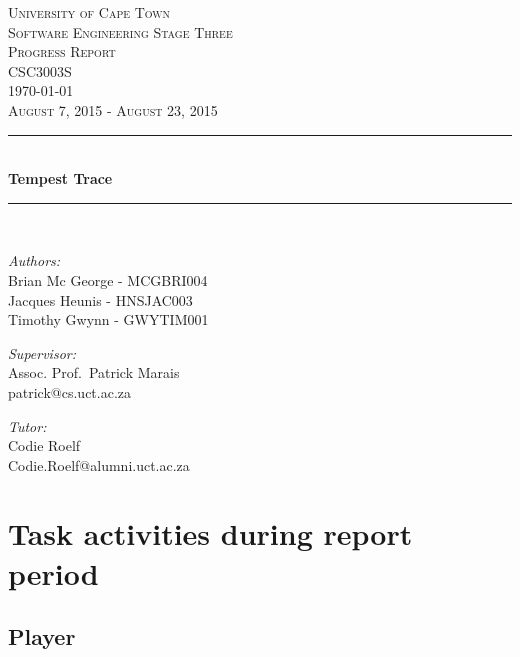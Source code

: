 \documentclass[a4paper,10pt]{article}
\begin{document}
\begin{titlepage} \begin{center}
		\textsc{\LARGE University of Cape Town}
		\\[1.5cm] \textsc{\Large Software Engineering Stage Three} \\\smallskip
        \textsc{\Large Progress Report} \\\smallskip
        \textsc{\Large CSC3003S} \\\smallskip
        \textsc{\Large \today} \\\smallskip
        \textsc{\Large August 7, 2015 - August 23, 2015}
		\\[0.5cm]
		\noindent\rule[0.4mm]{\textwidth}{0.1mm}
		\\[0.4cm] { \huge \bfseries Tempest Trace \\[0.4cm] }
		\noindent\rule[0.4mm]{\textwidth}{0.1mm}
		\\[1cm]
		\begin{minipage}[t]{0.4\textwidth}
		\begin{flushleft}\large \emph{Authors:}\\ Brian Mc George - MCGBRI004 \\ Jacques Heunis - HNSJAC003 \\ Timothy Gwynn - GWYTIM001
        \\[2cm]
            \end{flushleft}
		 \end{minipage} \begin{minipage}[t]{0.4\textwidth}
		\begin{flushright} \large \emph{Supervisor:} \\ Assoc. Prof.~Patrick Marais\\patrick@cs.uct.ac.za\end{flushright}
		\begin{flushright} \large \emph{Tutor:} \\ Codie Roelf\\Codie.Roelf@alumni.uct.ac.za\end{flushright}
		 \end{minipage}
		\end{center}
		\end{titlepage}
\newpage
\tableofcontents
\newpage

\section{Task activities during report period}
\subsection{Player}
\end{document}
